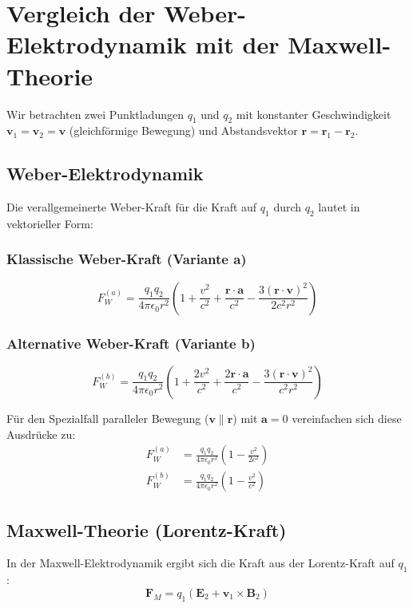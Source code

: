 \section{Vergleich der Weber-Elektrodynamik mit der Maxwell-Theorie}

Wir betrachten zwei Punktladungen $q_1$ und $q_2$ mit konstanter Geschwindigkeit $\mathbf{v}_1 = \mathbf{v}_2 = \mathbf{v}$ (gleichförmige Bewegung) und Abstandsvektor $\mathbf{r} = \mathbf{r}_1 - \mathbf{r}_2$.

\subsection{Weber-Elektrodynamik}
Die verallgemeinerte Weber-Kraft für die Kraft auf $q_1$ durch $q_2$ lautet in vektorieller Form:

\subsubsection{Klassische Weber-Kraft (Variante a)}
\begin{equation}
F_W^{(a)} = \frac{q_1 q_2}{4 \pi \epsilon_0 r^2} \left(1 + \frac{v^2}{c^2} + \frac{\mathbf{r} \cdot \mathbf{a}}{c^2} - \frac{3 (\mathbf{r} \cdot \mathbf{v})^2}{2 c^2 r^2}\right)
\end{equation}

\subsubsection{Alternative Weber-Kraft (Variante b)}
\begin{equation}
F_W^{(b)} = \frac{q_1 q_2}{4 \pi \epsilon_0 r^2} \left(1 + \frac{2 v^2}{c^2} + \frac{2 \mathbf{r} \cdot \mathbf{a}}{c^2} - \frac{3 (\mathbf{r} \cdot \mathbf{v})^2}{c^2 r^2}\right)
\end{equation}

Für den Spezialfall paralleler Bewegung ($\mathbf{v} \parallel \mathbf{r}$) mit $\mathbf{a} = 0$ vereinfachen sich diese Ausdrücke zu:
\begin{align}
F_W^{(a)} &= \frac{q_1 q_2}{4 \pi \epsilon_0 r^2} \left(1 - \frac{v^2}{2 c^2}\right) \\
F_W^{(b)} &= \frac{q_1 q_2}{4 \pi \epsilon_0 r^2} \left(1 - \frac{v^2}{c^2}\right)
\end{align}

\subsection{Maxwell-Theorie (Lorentz-Kraft)}
In der Maxwell-Elektrodynamik ergibt sich die Kraft aus der Lorentz-Kraft auf $q_1$:
\begin{equation}
\mathbf{F}_M = q_1 (\mathbf{E}_2 + \mathbf{v}_1 \times \mathbf{B}_2)
\end{equation}

